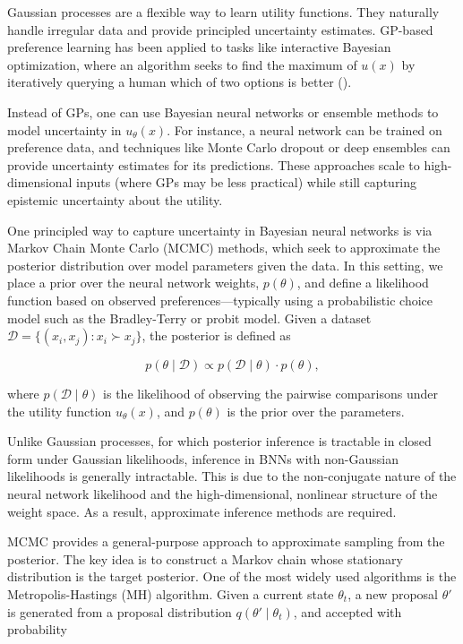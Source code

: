 \documentclass[
  letterpaper,
  numbers=noenddot,
  DIV=11]{scrreprt}
\theoremstyle{plain}
\theoremstyle{definition}
\theoremstyle{remark}
\begin{document}
Gaussian processes are a flexible way to learn utility functions. They
naturally handle irregular data and provide principled uncertainty
estimates. GP-based preference learning has been applied to tasks like
interactive Bayesian optimization, where an algorithm seeks to find the
maximum of \(u(x)\) by iteratively querying a human which of two options
is better ().

Instead of GPs, one can use Bayesian neural networks or ensemble methods
to model uncertainty in \(u_\theta(x)\). For instance, a neural network
can be trained on preference data, and techniques like Monte Carlo
dropout or deep ensembles can provide uncertainty estimates for its
predictions. These approaches scale to high-dimensional inputs (where
GPs may be less practical) while still capturing epistemic uncertainty
about the utility.

One principled way to capture uncertainty in Bayesian neural networks is
via Markov Chain Monte Carlo (MCMC) methods, which seek to approximate
the posterior distribution over model parameters given the data. In this
setting, we place a prior over the neural network weights,
\(p(\theta)\), and define a likelihood function based on observed
preferences---typically using a probabilistic choice model such as the
Bradley-Terry or probit model. Given a dataset
\(\mathcal{D} = \{(x_i, x_j) : x_i \succ x_j\}\), the posterior is
defined as

\[
p(\theta \mid \mathcal{D}) \propto p(\mathcal{D} \mid \theta) \cdot p(\theta),
\]

where \(p(\mathcal{D} \mid \theta)\) is the likelihood of observing the
pairwise comparisons under the utility function \(u_\theta(x)\), and
\(p(\theta)\) is the prior over the parameters.

Unlike Gaussian processes, for which posterior inference is tractable in
closed form under Gaussian likelihoods, inference in BNNs with
non-Gaussian likelihoods is generally intractable. This is due to the
non-conjugate nature of the neural network likelihood and the
high-dimensional, nonlinear structure of the weight space. As a result,
approximate inference methods are required.

MCMC provides a general-purpose approach to approximate sampling from
the posterior. The key idea is to construct a Markov chain whose
stationary distribution is the target posterior. One of the most widely
used algorithms is the Metropolis-Hastings (MH) algorithm. Given a
current state \(\theta_t\), a new proposal \(\theta'\) is generated from
a proposal distribution \(q(\theta' \mid \theta_t)\), and accepted with
probability
\end{document}
